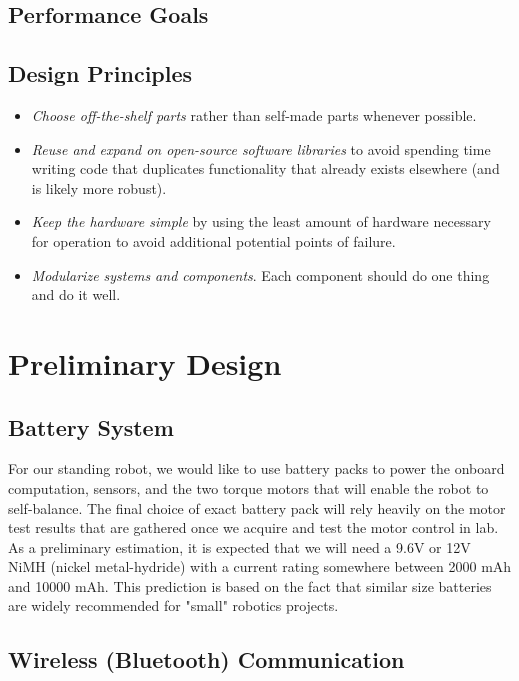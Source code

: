 \documentclass[11pt]{report}
\begin{document}
\begin{spacing}{1.5}
\subsection*{Performance Goals}



\subsection*{Design Principles}

\begin{itemize}[noitemsep,nolistsep]
    \item \emph{Choose off-the-shelf parts} rather than self-made parts whenever possible.
    \item \emph{Reuse and expand on open-source software libraries} to avoid spending time writing code that duplicates functionality that already exists elsewhere (and is likely more robust).
    \item \emph{Keep the hardware simple} by using the least amount of hardware necessary for operation to avoid additional potential points of failure.
    \item \emph{Modularize systems and components}. Each component should do one thing and do it well.
\end{itemize}

\section*{Preliminary Design} %


\subsection*{Battery System}

For our standing robot, we would like to use battery packs to power the onboard computation, sensors, and the two torque motors that will enable the robot to self-balance. The final choice of exact battery pack will rely heavily on the motor test results that are gathered once we acquire and test the motor control in lab. As a preliminary estimation, it is expected that we will need a 9.6V or 12V NiMH (nickel metal-hydride) with a current rating somewhere between 2000 mAh and 10000 mAh. This prediction is based on the fact that similar size batteries are widely recommended for "small" robotics projects.

\subsection*{Wireless (Bluetooth\textsuperscript{\textregistered}) Communication}


\end{spacing}
\end{document}
